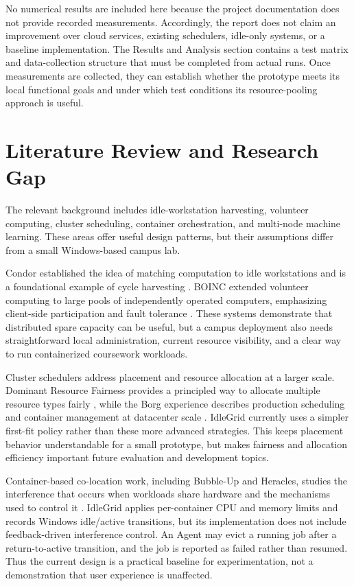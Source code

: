 \documentclass{article}
\begin{document}
No numerical results are included here because the project documentation does not provide recorded measurements. Accordingly, the report does not claim an improvement over cloud services, existing schedulers, idle-only systems, or a baseline implementation. The Results and Analysis section contains a test matrix and data-collection structure that must be completed from actual runs. Once measurements are collected, they can establish whether the prototype meets its local functional goals and under which test conditions its resource-pooling approach is useful.

	\pagebreak
    
	\section{Literature Review and Research Gap}
The relevant background includes idle-workstation harvesting, volunteer computing, cluster scheduling, container orchestration, and multi-node machine learning. These areas offer useful design patterns, but their assumptions differ from a small Windows-based campus lab.

Condor established the idea of matching computation to idle workstations and is a foundational example of cycle harvesting \cite{condor}. BOINC extended volunteer computing to large pools of independently operated computers, emphasizing client-side participation and fault tolerance \cite{boinc}. These systems demonstrate that distributed spare capacity can be useful, but a campus deployment also needs straightforward local administration, current resource visibility, and a clear way to run containerized coursework workloads.

Cluster schedulers address placement and resource allocation at a larger scale. Dominant Resource Fairness provides a principled way to allocate multiple resource types fairly \cite{drf}, while the Borg experience describes production scheduling and container management at datacenter scale \cite{borg}. IdleGrid currently uses a simpler first-fit policy rather than these more advanced strategies. This keeps placement behavior understandable for a small prototype, but makes fairness and allocation efficiency important future evaluation and development topics.

Container-based co-location work, including Bubble-Up and Heracles, studies the interference that occurs when workloads share hardware and the mechanisms used to control it \cite{bubbleup,heracles}. IdleGrid applies per-container CPU and memory limits and records Windows idle/active transitions, but its implementation does not include feedback-driven interference control. An Agent may evict a running job after a return-to-active transition, and the job is reported as failed rather than resumed. Thus the current design is a practical baseline for experimentation, not a demonstration that user experience is unaffected.
\end{document}
